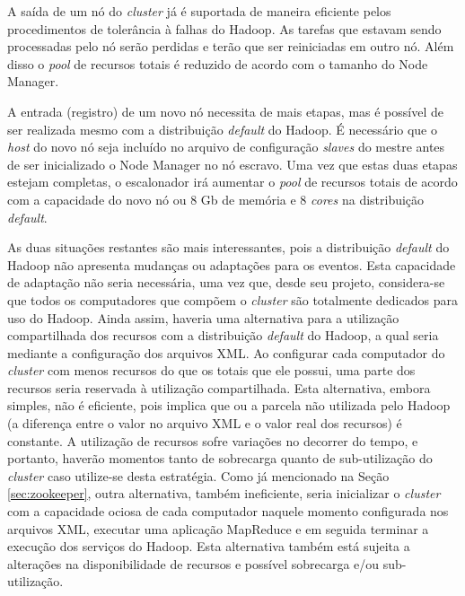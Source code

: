A saída de um nó do \textit{cluster} já é suportada de maneira eficiente pelos procedimentos de tolerância à falhas do Hadoop. As tarefas que estavam sendo processadas pelo nó serão perdidas e terão que ser reiniciadas em outro nó. Além disso o \textit{pool} de recursos totais é reduzido de acordo com o tamanho do Node Manager.

A entrada (registro) de um novo nó necessita de mais etapas, mas é possível de ser realizada mesmo com a distribuição \textit{default} do Hadoop. É necessário que o \textit{host} do novo nó seja incluído no arquivo de configuração \textit{slaves} do mestre antes de ser inicializado o Node Manager no nó escravo. Uma vez que estas duas etapas estejam completas, o escalonador irá aumentar o \textit{pool} de recursos totais de acordo com a capacidade do novo nó ou 8 Gb de memória e 8 \textit{cores} na distribuição \textit{default}.

As duas situações restantes são mais interessantes, pois a distribuição \textit{default} do Hadoop não apresenta mudanças ou adaptações para os eventos. Esta capacidade de adaptação não seria necessária, uma vez que, desde seu projeto, considera-se que todos os computadores que compõem o \textit{cluster} são totalmente dedicados para uso do Hadoop. Ainda assim, haveria uma alternativa para a utilização compartilhada dos recursos com a distribuição \textit{default} do Hadoop, a qual seria mediante a configuração dos arquivos XML. Ao configurar cada computador do \textit{cluster} com menos recursos do que os totais que ele possui, uma parte dos recursos seria reservada à utilização compartilhada. Esta alternativa, embora simples, não é eficiente, pois implica que ou a parcela não utilizada pelo Hadoop (a diferença entre o valor no arquivo XML e o valor real dos recursos) é constante. A utilização de recursos sofre variações no decorrer do tempo, e portanto, haverão momentos tanto de sobrecarga quanto de sub-utilização do \textit{cluster} caso utilize-se desta estratégia. Como já mencionado na Seção \ref{sec:zookeeper}, outra alternativa, também ineficiente, seria inicializar o \textit{cluster} com a capacidade ociosa de cada computador naquele momento configurada nos arquivos XML, executar uma aplicação MapReduce e em seguida terminar a execução dos serviços do Hadoop. Esta alternativa também está sujeita a alterações na disponibilidade de recursos e possível sobrecarga e/ou sub-utilização.

